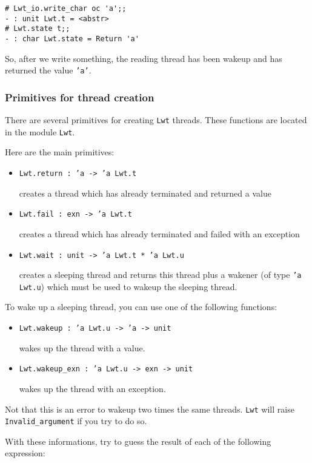 \documentclass{article}
\newcommand{\lwt}{\texttt{Lwt}\xspace}
\begin{document}
\begin{verbatim}
# Lwt_io.write_char oc 'a';;
- : unit Lwt.t = <abstr>
# Lwt.state t;;
- : char Lwt.state = Return 'a'
\end{verbatim}

So, after we write something, the reading thread has been wakeup and
has returned the value \texttt{'a'}.

\subsubsection{Primitives for thread creation}

There are several primitives for creating \lwt threads. These
functions are located in the module \texttt{Lwt}.

Here are the main primitives:

\begin{itemize}
\item \texttt{Lwt.return : 'a -> 'a Lwt.t}

  creates a thread which has already terminated and returned a value
\item \texttt{Lwt.fail : exn -> 'a Lwt.t}

  creates a thread which has already terminated and failed with an
  exception
\item \texttt{Lwt.wait : unit -> 'a Lwt.t * 'a Lwt.u}

  creates a sleeping thread and returns this thread plus a wakener (of
  type \texttt{'a Lwt.u}) which must be used to wakeup the sleeping
  thread.
\end{itemize}

To wake up a sleeping thread, you can use one of the following
functions:

\begin{itemize}
\item \texttt{Lwt.wakeup : 'a Lwt.u -> 'a -> unit}

  wakes up the thread with a value.
\item \texttt{Lwt.wakeup\_exn : 'a Lwt.u -> exn -> unit}

  wakes up the thread with an exception.
\end{itemize}

Not that this is an error to wakeup two times the same threads. \lwt
will raise \texttt{Invalid\_argument} if you try to do so.

With these informations, try to guess the result of each of the
following expression:
\end{document}
